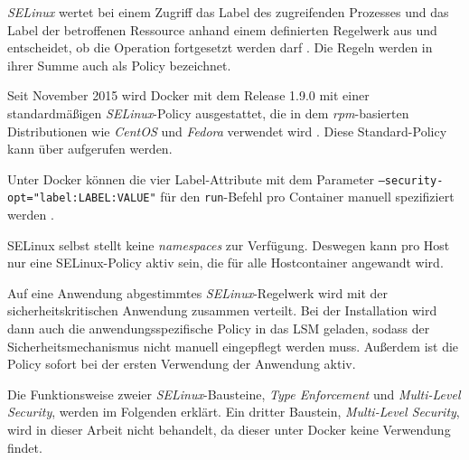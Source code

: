 \documentclass[../main.tex]{subfiles}
\begin{document}
				\emph{SELinux} wertet bei einem Zugriff das Label des zugreifenden Prozesses und das Label der betroffenen Ressource anhand einem definierten Regelwerk aus und entscheidet, ob die Operation fortgesetzt werden darf \cite{linuxSecOverview}. Die Regeln werden in ihrer Summe auch als Policy bezeichnet.

				Seit November 2015 wird Docker mit dem Release 1.9.0 mit einer standardmäßigen \emph{SELinux}-Policy ausgestattet, die in dem \emph{rpm}-basierten Distributionen wie \emph{CentOS} und \emph{Fedora} verwendet wird \cite{githubDockerChangelog}\cite{githubSELinuxPolicyIssue}. Diese Standard-Policy kann über \cite{githubSELinuxProfile} aufgerufen werden.

				Unter Docker können die vier Label-Attribute mit dem Parameter \texttt{--security-opt="label:LABEL:VALUE"} für den \texttt{run}-Befehl pro Container manuell spezifiziert werden \cite{dockerRun}.


				SELinux selbst stellt keine \emph{namespaces} zur Verfügung. Deswegen kann pro Host nur eine SELinux-Policy aktiv sein, die für alle Hostcontainer angewandt wird.

				Auf eine Anwendung abgestimmtes \emph{SELinux}-Regelwerk wird mit der sicherheitskritischen Anwendung zusammen verteilt. Bei der Installation wird dann auch die anwendungsspezifische Policy in das LSM geladen, sodass der Sicherheitsmechanismus nicht manuell eingepflegt werden muss. Außerdem ist die Policy sofort bei der ersten Verwendung der Anwendung aktiv.

				Die Funktionsweise zweier \emph{SELinux}-Bausteine, \emph{Type Enforcement} und \emph{Multi-Level Security}, werden im Folgenden erklärt. Ein dritter Baustein, \emph{Multi-Level Security}, wird in dieser Arbeit nicht behandelt, da dieser unter Docker keine Verwendung findet.


\end{document}
